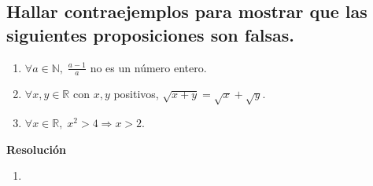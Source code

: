 \documentclass[11pt]{article}
\begin{document}
\subsection{Hallar contraejemplos para mostrar que las siguientes proposiciones son falsas.}

\begin{enumerate}[label=\roman*)]
    \item $\forall a \in \mathbb{N}, \; \frac{a-1}{a}$ no es un número entero.
    \item $\forall x, y \in \mathbb{R}$ con $x, y$ positivos, $\sqrt{x+y} = \sqrt{x} + \sqrt{y}$.
    \item $\forall x \in \mathbb{R}, \; x^2 > 4 \Rightarrow x > 2$.
\end{enumerate}

\textbf{Resolución}
\begin{enumerate}[label=\roman*]
    \item 
\end{enumerate}
\end{document}
